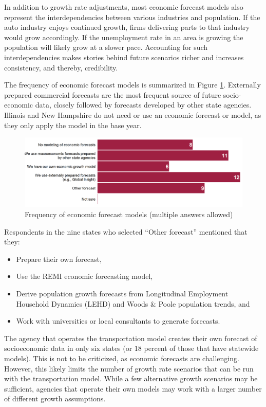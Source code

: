 In addition to growth rate adjustments, most economic forecast models also represent the interdependencies between various industries and population. If the auto industry enjoys continued growth, firms delivering parts to that industry would grow accordingly. If the unemployment rate in an area is growing the population will likely grow at a slower pace. Accounting for such interdependencies makes stories behind future scenarios richer and increases consistency, and thereby, credibility.

The frequency of economic forecast models is summarized in Figure \ref{fig:economic-model-frequency}. Externally prepared commercial forecasts are the most frequent source of future socio-economic data, closely followed by forecasts developed by other state agencies. Illinois and New Hampshire do not need or use an economic forecast or model, as they only apply the model in the base year.

\begin{figure}   %
\centering
\includegraphics[width=6.4in]{graphics/27-economic-model-frequency}
\caption[Frequency of economic forecast models]{Frequency of economic forecast models (multiple answers allowed)}
\label{fig:economic-model-frequency}
\end{figure}

Respondents in the nine states who selected ``Other forecast'' mentioned that they:
\begin{itemize}
\item Prepare their own forecast,
\item Use the REMI economic forecasting model,
\item Derive population growth forecasts from Longitudinal Employment Household Dynamics (LEHD) and Woods \& Poole population trends, and
\item Work with universities or local consultants to generate forecasts.
\end{itemize}

The agency that operates the transportation model creates their own forecast of socioeconomic data in only six states (or 18 percent of those that have statewide models). This is not to be criticized, as economic forecasts are challenging. However, this likely limits the number of growth rate scenarios that can be run with the transportation model. While a few alternative growth scenarios may be sufficient, agencies that operate their own models may work with a larger number of different growth assumptions.

